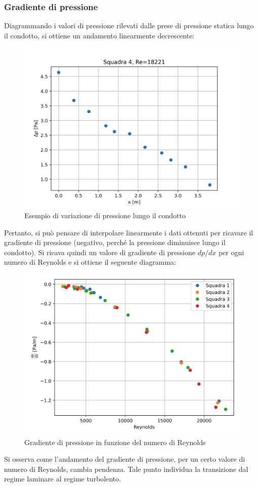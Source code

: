\subsubsection{Gradiente di pressione}
Diagrammando i valori di pressione rilevati dalle prese di pressione statica lungo il condotto, si ottiene un andamento linearmente decrescente:
\begin{figure}[H]
    \centering
    \includegraphics[width=.65\textwidth]{images/7/p.png}
    \caption{Esempio di variazione di pressione lungo il condotto}
\end{figure}

\noindent Pertanto, si può pensare di interpolare linearmente i dati ottenuti per ricavare il gradiente di pressione (negativo, perché la pressione diminuisce lungo il condotto). Si ricava quindi un valore di gradiente di pressione $dp/dx$ per ogni numero di Reynolds e si ottiene il seguente diagramma:
\begin{figure}[H]
    \centering
    \includegraphics[width=.7\textwidth]{images/7/dpdx.png}
    \caption{Gradiente di pressione in funzione del numero di Reynolds}
\end{figure}

\noindent Si osserva come l'andamento del gradiente di pressione, per un certo valore di numero di Reynolds, cambia pendenza. Tale punto individua la transizione dal regime laminare al regime turbolento.

